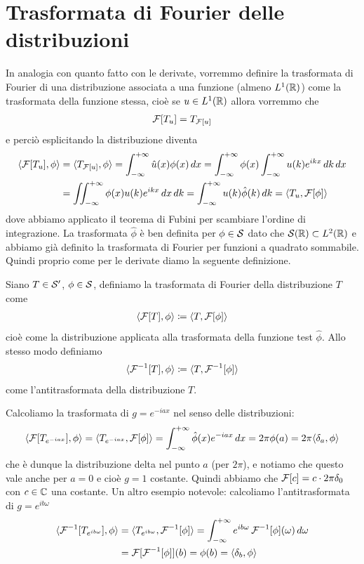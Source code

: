 \section{Trasformata di Fourier delle distribuzioni}
In analogia con quanto fatto con le derivate, vorremmo definire la trasformata di Fourier di una distribuzione associata a una funzione 
(almeno $ L^1(\R) $) come la trasformata della funzione stessa, cioè se $ u \in L^1(\R) $ allora vorremmo che 
\begin{align}
  \F[T_u] = T_{\F[u]}
\end{align}
e perciò esplicitando la distribuzione diventa 
\begin{align}
  \sc{\F[T_u], \phi} &= \sc{T_{\F[u]}, \phi} = \int_{-\infty}^{+\infty} \hat{u}(x) \phi(x) \,dx 
  = \int_{-\infty}^{+\infty} \phi(x)  \int_{-\infty}^{+\infty} {u}(k) e^{ikx} \,dk \,dx 
  \\
  &= \iint_{-\infty}^{+\infty} \phi(x) {u}(k) e^{ikx}  \,dx \,dk 
  = \int_{-\infty}^{+\infty} {u}(k) \hat{\phi}(k) \,dk = \sc{T_u, \F[\phi]}
\end{align}
dove abbiamo applicato il teorema di Fubini per scambiare l'ordine di integrazione. La trasformata $ \hat{\phi} $ è ben definita per $ \phi \in \S $ 
dato che $ \S(\R) \subset L^2(\R) $ e abbiamo già definito la trasformata di Fourier per funzioni a quadrato sommabile. 
Quindi proprio come per le derivate diamo la seguente definizione.

\begin{definition}
  Siano $ T \in \S' $, $ \phi \in \S $, definiamo la trasformata di Fourier della distribuzione $ T $ come 
  \begin{align}
    \sc{\F[T], \phi} \coloneq \sc{T, \F[\phi]}
  \end{align}
  cioè come la distribuzione applicata alla trasformata della funzione test $ \hat{\phi} $. Allo stesso modo definiamo  
  \begin{align}
    \sc{\F^{-1}[T], \phi} \coloneq \sc{T, \F^{-1}[\phi]}
  \end{align}
  come l'antitrasformata della distribuzione $ T $.
\end{definition}

Calcoliamo la trasformata di $ g = e^{-i a x} $ nel senso delle distribuzioni:
\begin{align}
  \sc{\F[T_{e^{-iax}}], \phi} = \sc{T_{e^{-iax}}, \F[\phi]} = \int_{-\infty}^{+\infty} \hat{\phi}(x) e^{-iax} \, dx 
  = 2\pi \phi(a) = 2\pi \sc{\delta_a, \phi}
\end{align}
che è dunque la distribuzione delta nel punto $ a $ (per $ 2\pi $), e notiamo che questo vale anche per $ a = 0 $ e cioè $ g = 1 $ costante. Quindi 
abbiamo che $ \F[c] = c \cdot 2\pi \delta_0 $ con $ c \in \C $ una costante.
Un altro esempio notevole: calcoliamo l'antitrasformata di $ g = e^{ib\omega} $
\begin{align}
  \sc{\F^{-1}[T_{e^{ib\omega}}], \phi} &= \sc{T_{e^{ib\omega}}, \F^{-1}[\phi]} = \int_{-\infty}^{+\infty}e^{ib\omega} \F^{-1}[{\phi}](\omega) \,d\omega
  \\
  &= \F[\F^{-1}[\phi]](b) = \phi(b) = \sc{\delta_b, \phi}
\end{align}

